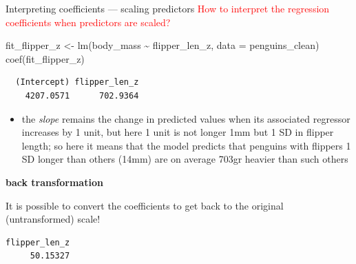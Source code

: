 \documentclass[
  10pt,
  ignorenonframetext,
  aspectratio=169,
  t]{beamer}
\newenvironment{Shaded}{\begin{snugshade}}{\end{snugshade}}
\newcommand{\AttributeTok}[1]{\textcolor[rgb]{0.40,0.45,0.13}{#1}}
\newcommand{\FunctionTok}[1]{\textcolor[rgb]{0.28,0.35,0.67}{#1}}
\newcommand{\NormalTok}[1]{\textcolor[rgb]{0.00,0.23,0.31}{#1}}
\newcommand{\OtherTok}[1]{\textcolor[rgb]{0.00,0.23,0.31}{#1}}
\newcommand{\SpecialCharTok}[1]{\textcolor[rgb]{0.37,0.37,0.37}{#1}}
\newcommand{\StringTok}[1]{\textcolor[rgb]{0.13,0.47,0.30}{#1}}
\providecommand{\tightlist}{%
  \setlength{\itemsep}{0pt}\setlength{\parskip}{0pt}}
\newcommand{\blueit}[1]{\textcolor{bluebeamer}{\emph{#1}}}
\newcommand{\bluebold}[1]{\textcolor{bluebeamer}{\textbf{#1}}}
\begin{document}
\begin{frame}[fragile]{Interpreting coefficients --- scaling predictors}
\protect{}\label{interpreting-coefficients-scaling-predictors-2}
\textcolor{red}{How to interpret the regression coefficients when predictors are scaled?}

\footnotesize

\begin{Shaded}
\begin{Highlighting}[]
\NormalTok{fit\_flipper\_z }\OtherTok{\textless{}{-}} \FunctionTok{lm}\NormalTok{(body\_mass }\SpecialCharTok{\textasciitilde{}}\NormalTok{ flipper\_len\_z, }\AttributeTok{data =}\NormalTok{ penguins\_clean)}
\FunctionTok{coef}\NormalTok{(fit\_flipper\_z)}
\end{Highlighting}
\end{Shaded}

\begin{verbatim}
  (Intercept) flipper_len_z 
    4207.0571      702.9364 
\end{verbatim}

\normalsize

\begin{itemize}
\tightlist
\item
  the \blueit{slope} remains the change in predicted values when its
  associated regressor increases by 1 unit, but here 1 unit is not
  longer 1mm but 1 SD in flipper length; so here it means that the model
  predicts that penguins with flippers 1 SD longer than others (14mm)
  are on average 703gr heavier than such others
\end{itemize}

\bluebold{back transformation}

It is possible to convert the coefficients to get back to the original
(untransformed) scale!

\footnotesize

\begin{Shaded}
\end{Shaded}

\begin{verbatim}
flipper_len_z 
     50.15327 
\end{verbatim}

\normalsize
\end{frame}
\end{document}

